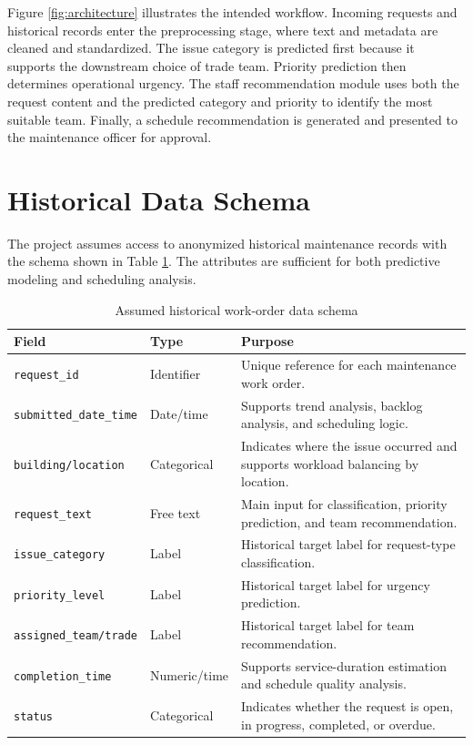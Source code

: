 \documentclass[11pt,a4paper]{report}
\begin{document}
Figure \ref{fig:architecture} illustrates the intended workflow. Incoming requests and historical records enter the preprocessing stage, where text and metadata are cleaned and standardized. The issue category is predicted first because it supports the downstream choice of trade team. Priority prediction then determines operational urgency. The staff recommendation module uses both the request content and the predicted category and priority to identify the most suitable team. Finally, a schedule recommendation is generated and presented to the maintenance officer for approval.

\section{Historical Data Schema}
The project assumes access to anonymized historical maintenance records with the schema shown in Table \ref{tab:schema}. The attributes are sufficient for both predictive modeling and scheduling analysis.

\begin{table}[H]
\centering
\caption{Assumed historical work-order data schema}
\label{tab:schema}
\begin{tabularx}{\textwidth}{|p{3.2cm}|p{2.5cm}|X|}
\hline
\textbf{Field} & \textbf{Type} & \textbf{Purpose} \\
\hline
\texttt{request\_id} & Identifier & Unique reference for each maintenance work order. \\
\hline
\texttt{submitted\_date\_time} & Date/time & Supports trend analysis, backlog analysis, and scheduling logic. \\
\hline
\texttt{building/location} & Categorical & Indicates where the issue occurred and supports workload balancing by location. \\
\hline
\texttt{request\_text} & Free text & Main input for classification, priority prediction, and team recommendation. \\
\hline
\texttt{issue\_category} & Label & Historical target label for request-type classification. \\
\hline
\texttt{priority\_level} & Label & Historical target label for urgency prediction. \\
\hline
\texttt{assigned\_team/trade} & Label & Historical target label for team recommendation. \\
\hline
\texttt{completion\_time} & Numeric/time & Supports service-duration estimation and schedule quality analysis. \\
\hline
\texttt{status} & Categorical & Indicates whether the request is open, in progress, completed, or overdue. \\
\hline
\end{tabularx}
\end{table}
\end{document}
